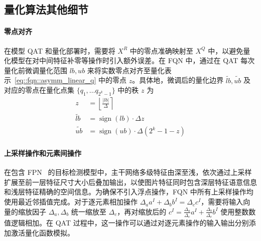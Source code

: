 \documentclass[
  fontset = source,
]{shtthesis}
\providecommand{\Round}[1]{\left\lfloor #1 \right\rceil}
\DeclareMathOperator{\sign}{sign}
\begin{document}
\subsection{量化算法其他细节} \label{sec::fqn::q_misc}
\paragraph{零点对齐}
在模型 QAT 和量化部署时，需要将 $X^R$ 中的零点准确映射至 $X^Q$ 中，以避免量化模型在对中间特征补零等操作时引入额外误差。在 FQN 中，通过在 QAT 每次量化前微调量化范围 $lb, ub$ 来将实数零点对齐至量化表示~\eqref{eq::fqn::asymm_linear_q} 中的零点 $z$。具体地，微调后的量化边界 $\tilde{lb}, \tilde{ub}$ 及对应的零点在量化点集 $\{q_1, \ldots q_{2^k-1}\}$ 中的秩 $z$ 为
\begin{align}
  z &= \Round{\frac{|lb|}{\Delta}} \\
  \tilde{lb} &= \sign(lb) \cdot \Delta z \\
  \tilde{ub} &= \sign(ub) \cdot \Delta (2^k - 1 - z)
\end{align}

\paragraph{上采样操作和元素间操作}
在包含 FPN~\citep{lin2017feature} 的目标检测模型中，主干网络多级特征由深至浅，依次通过上采样扩展至前一层特征尺寸大小后叠加输出，以使图片特征同时包含深层特征语意信息和浅层特征精确的空间信息。为确保不引入浮点操作，FQN 中所有上采样操作均使用最近邻插值完成。对于逐元素相加操作 $\Delta_a a^I + \Delta_b b^I = \Delta_c c^I$，需要将输入向量的缩放因子 $\Delta_a, \Delta_b$ 统一缩放至 $\Delta_c$，再对缩放后的 $c^I = \frac{\Delta_a}{\Delta_c}a^{I} + \frac{\Delta_b}{\Delta_c}b^{I}$ 使用整数数值逻辑相加。在 QAT 过程中，这一操作可以通过对逐元素操作的输入输出分别添加激活量化函数模拟。
\end{document}
